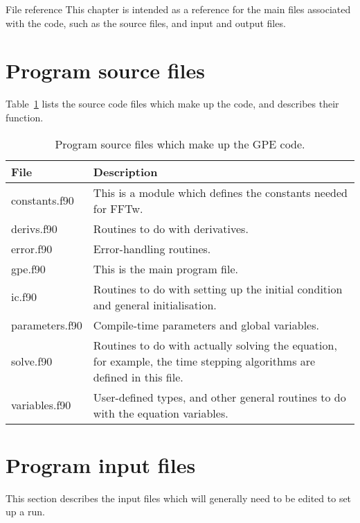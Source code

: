 
\begin{chapter}{\label{cha:file_reference}File reference}
  This chapter is intended as a reference for the main files associated with
  the code, such as the source files, and input and output files.

  \section{Program source files}
  Table~\ref{tab:source_files} lists the  source code files which
  make up the code, and describes their function.
  \begin{table}[ht]
    \centering
    \begin{tabular}{lp{}}
      File & Description \\
      \hline
      constants.f90 & This is a module which defines the constants needed for
      FFTw. \\
      derivs.f90 & Routines to do with derivatives. \\
      error.f90 & Error-handling routines. \\
      gpe.f90 & This is the main program file. \\
      ic.f90 & Routines to do with setting up the initial condition and general
      initialisation. \\
      parameters.f90 & Compile-time parameters and global variables. \\
      solve.f90 & Routines to do with actually solving the equation, for
      example, the time stepping algorithms are defined in this file. \\
      variables.f90 & User-defined types, and other general routines to do with
      the equation variables. \\
      \hline
    \end{tabular}
    \caption{\label{tab:source_files}Program source files which make up the GPE
      code.}
  \end{table}

  \section{Program input files}
  This section describes the  input files which will generally
  need to be edited to set up a run.


\end{chapter}
